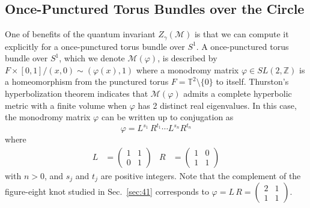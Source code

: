 \documentclass[12pt,reqno]{amsart}
\numberwithin{equation}{section}
\begin{document}
\subsection{Once-Punctured Torus Bundles over the Circle}

One of benefits of the quantum invariant $Z_\gamma(\mathcal{M})$ is
that we can compute it explicitly
for a once-punctured torus bundle over $S^1$.
A once-punctured torus bundle
over $S^1$, which we denote  $\mathcal{M}(\varphi)$,
 is
described by
$F \times [0,1]/(x,0) \sim (\varphi(x),1)$ where
a monodromy matrix 
$\varphi \in SL(2,\mathbb{Z})$
is a homeomorphism from the punctured torus
$F=\mathbb{T}^2 \setminus \{ 0 \}$ to itself.
Thurston's hyperbolization theorem indicates that
$\mathcal{M}(\varphi)$ admits
a complete hyperbolic metric with a finite volume when $\varphi$ has 2
distinct real eigenvalues.
In this case, the monodromy matrix $\varphi$  can be written up to
conjugation as
\begin{equation}
  \varphi
  =
  L^{s_1} \, R^{t_1} \cdots
  L^{s_{n}}
  R^{t_{n}}
\end{equation}
where
\begin{align*}
  L 
  & =
  \begin{pmatrix}
    1 & 1 \\
    0 & 1
  \end{pmatrix}
  &
  R
  &=
  \begin{pmatrix}
    1 & 0 \\
    1 & 1
  \end{pmatrix}
\end{align*}
with
$n>0$,
and $s_j$ and $t_j$  are positive integers.
Note that 
the complement of the figure-eight knot studied in Sec.~\ref{sec:41}
corresponds to
$\varphi=L \, R =
\begin{pmatrix}
  2 & 1 \\
  1 & 1
\end{pmatrix}
$.
\end{document}
